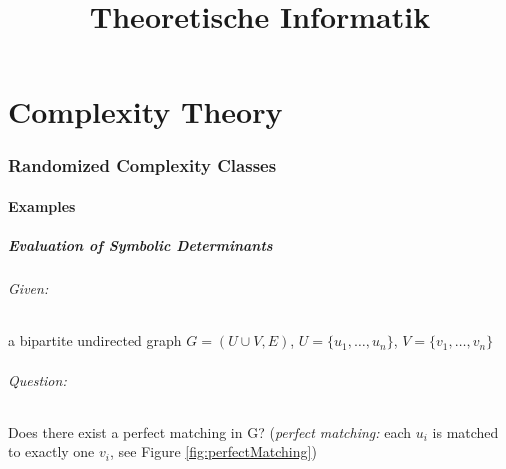 \documentclass[11pt]{article}
\theoremstyle{definition}
\theoremstyle{definition}
\begin{document}
\setlength{\parindent}{0pt}


\title{Theoretische Informatik}
\author{}
\date {}

\maketitle

\tableofcontents

\part{Complexity Theory}
\section{Randomized Complexity Classes}

\subsection{Examples}

\subsubsection{Evaluation of Symbolic Determinants}


\paragraph{Given:} a bipartite undirected graph $ G = (U \cup V, E) $, $ U = \{u_1, \dots, u_n \} $, $ V = \{ v_1, \dots, v_n \} $

\paragraph{Question:} Does there exist a perfect matching in G? (\textit{perfect matching:} each $ u_i $ is matched to exactly one $ v_i $, see Figure \ref{fig:perfectMatching})

\end{document}
